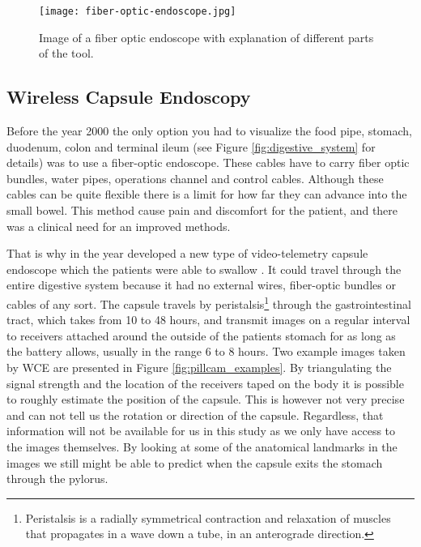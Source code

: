 \documentclass[thesis.tex]{subfiles}
\begin{document}
\begin{figure}[h] %
  \begin{center}
    \texttt{[image: fiber-optic-endoscope.jpg]}
    \caption[Image of a fiber optic endoscope with explanation of different parts of the tool]{Image of a fiber optic endoscope with explanation of different parts of the tool\footnotemark.}
    \label{fig:fiber-optic-endoscopy}
  \end{center}
\end{figure}




\subsection{Wireless Capsule Endoscopy}  \label{sec:wireless_capsule_endoscopy}
Before the year 2000 the only option you had to visualize the food pipe, stomach, duodenum, colon and terminal ileum (see Figure \ref{fig:digestive_system} for details) was to use a fiber-optic endoscope. These cables have to carry fiber optic bundles, water pipes, operations channel and control cables. Although these cables can be quite flexible there is a limit for how far they can advance into the small bowel. This method cause pain and discomfort for the patient, and there was a clinical need for an improved methods.

That is why in the year \citeyear{WirelessCapsule00} \citeauthor*{WirelessCapsule00} developed a new type of video-telemetry capsule endoscope which the patients were able to swallow \cite{WirelessCapsule00}. It could travel through the entire digestive system because it had no external wires, fiber-optic bundles or cables of any sort. The capsule travels by peristalsis\footnote{Peristalsis is a radially symmetrical contraction and relaxation of muscles that propagates in a wave down a tube, in an anterograde direction.} through the gastrointestinal tract, which takes from 10 to 48 hours, and transmit images on a regular interval to receivers attached around the outside of the patients stomach for as long as the battery allows, usually in the range 6 to 8 hours. Two example images taken by WCE are presented in Figure \ref{fig:pillcam_examples}. By triangulating the signal strength and the location of the receivers taped on the body it is possible to roughly estimate the position of the capsule. This is however not very precise and can not tell us the rotation or direction of the capsule. Regardless, that information will not be available for us in this study as we only have access to the images themselves. By looking at some of the anatomical landmarks in the images we still might be able to predict when the capsule exits the stomach through the pylorus. 
\end{document}
